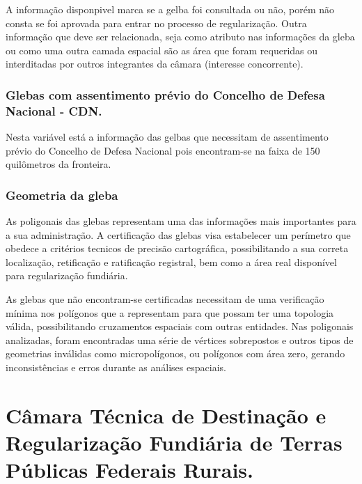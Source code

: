\documentclass[
  letterpaper,
]{report}
\begin{document}
A informação disponpivel marca se a gelba foi consultada ou não, porém
não consta se foi aprovada para entrar no processo de regularização.
Outra informação que deve ser relacionada, seja como atributo nas
informações da gleba ou como uma outra camada espacial são as área que
foram requeridas ou interditadas por outros integrantes da câmara
(interesse concorrente).

\hypertarget{glebas-com-assentimento-pruxe9vio-do-concelho-de-defesa-nacional---cdn.}{%
\subsection{Glebas com assentimento prévio do Concelho de Defesa
Nacional -
CDN.}\label{glebas-com-assentimento-pruxe9vio-do-concelho-de-defesa-nacional---cdn.}}

Nesta variável está a informação das gelbas que necessitam de
assentimento prévio do Concelho de Defesa Nacional pois encontram-se na
faixa de 150 quilômetros da fronteira.

\hypertarget{geometria-da-gleba}{%
\subsection{Geometria da gleba}\label{geometria-da-gleba}}

As poligonais das glebas representam uma das informações mais
importantes para a sua administração. A certificação das glebas visa
estabelecer um perímetro que obedece a critérios tecnicos de precisão
cartográfica, possibilitando a sua correta localização, retificação e
ratificação registral, bem como a área real disponível para
regularização fundiária.

As glebas que não encontram-se certificadas necessitam de uma
verificação mínima nos polígonos que a representam para que possam ter
uma topologia válida, possibilitando cruzamentos espaciais com outras
entidades. Nas poligonais analizadas, foram encontradas uma série de
vértices sobrepostos e outros tipos de geometrias inválidas como
micropolígonos, ou polígonos com área zero, gerando inconsistências e
erros durante as análises espaciais.


\hypertarget{cuxe2mara-tuxe9cnica-de-destinauxe7uxe3o-e-regularizauxe7uxe3o-fundiuxe1ria-de-terras-puxfablicas-federais-rurais.}{%
\chapter{Câmara Técnica de Destinação e Regularização Fundiária de
Terras Públicas Federais
Rurais.}\label{cuxe2mara-tuxe9cnica-de-destinauxe7uxe3o-e-regularizauxe7uxe3o-fundiuxe1ria-de-terras-puxfablicas-federais-rurais.}}
\end{document}

